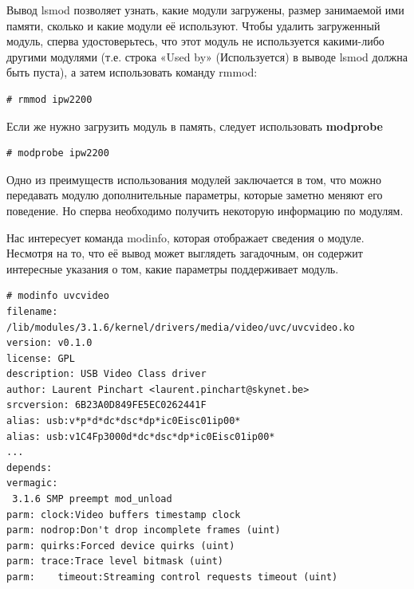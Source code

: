 \documentclass[10pt]{book}
\begin{document}
Вывод lsmod позволяет узнать, какие модули загружены, размер занимаемой ими памяти, сколько и какие модули её используют.
Чтобы удалить загруженный модуль, сперва удостоверьтесь, что этот модуль не используется какими-либо другими модулями (т.е. строка «Used by» (Используется) в выводе lsmod должна быть пуста), а затем использовать команду rmmod:

\vspace{3mm}
\begin{tcolorbox}
\begin{lstlisting}
# rmmod ipw2200
\end{lstlisting}
\end{tcolorbox}

Если же нужно загрузить модуль в память, следует использовать \textbf{modprobe} 

\vspace{3mm}
\begin{tcolorbox}
\begin{lstlisting}
# modprobe ipw2200
\end{lstlisting}
\end{tcolorbox}

Одно из преимуществ использования модулей заключается в том, что можно передавать модулю дополнительные параметры, которые заметно меняют его поведение. Но сперва необходимо получить некоторую информацию по модулям.

Нас интересует команда modinfo, которая отображает сведения о модуле. Несмотря на то, что её вывод может выглядеть загадочным, он содержит интересные указания о том, какие параметры поддерживает модуль.

\vspace{3mm}
\begin{tcolorbox}
\begin{lstlisting}
# modinfo uvcvideo
filename: /lib/modules/3.1.6/kernel/drivers/media/video/uvc/uvcvideo.ko
version: v0.1.0
license: GPL
description: USB Video Class driver
author: Laurent Pinchart <laurent.pinchart@skynet.be>
srcversion: 6B23A0D849FE5EC0262441F
alias: usb:v*p*d*dc*dsc*dp*ic0Eisc01ip00*
alias: usb:v1C4Fp3000d*dc*dsc*dp*ic0Eisc01ip00*
...
depends:
vermagic:
 3.1.6 SMP preempt mod_unload
parm: clock:Video buffers timestamp clock
parm: nodrop:Don't drop incomplete frames (uint)
parm: quirks:Forced device quirks (uint)
parm: trace:Trace level bitmask (uint)
parm:	 timeout:Streaming control requests timeout (uint)
\end{lstlisting}
\end{tcolorbox}
\end{document}
